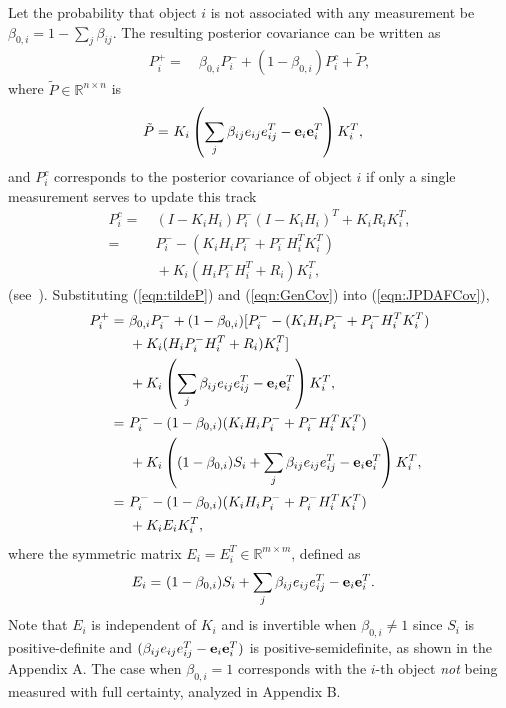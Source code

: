 \documentclass[letterpaper, 10pt, conference]{ieeeconf}
\newcommand{\parenth}[1]{\ensuremath{\left( #1 \right)}}
\newcommand{\refeqn}[1]{(\ref{eqn:#1})}
\renewcommand{\Re}{\ensuremath{\mathbb{R}}}
\begin{document}
Let the probability that object $i$ is not associated with any measurement be $\beta_{0,i}=1-{\sum\limits_{j} \beta_{ij}}$.
The resulting posterior covariance can be written as
\begin{align}
\label{eqn:JPDAFCov}
P^+_{i}=&\ \beta_{0,i}P^-_{i}+(1-\beta_{0,i})P_i^c+\tilde P,
\end{align}
where $\tilde P\in\Re^{n\times n}$ is
\begin{align}
\tilde P=&\ K_i\parenth{{\sum\limits_{j} \beta_{ij}e_{ij}e_{ij}^T-{\bf{e}}_{i}}{\bf{e}}_{i}^T}K_{i}^T,\label{eqn:tildeP}
\end{align}
and $P_i^c$ corresponds to the posterior covariance of object $i$ if only a single measurement serves to update this track~\cite{TrackDataAssoc}%
\begin{align}
P^c_i=&\ (I-K_iH_i)P^-_i(I-K_iH_i)^T+K_iR_iK_i^T,\nonumber
\\
=&\ P^-_i-(K_iH_iP^-_i+P^-_iH_i^TK_i^T)\nonumber
\\
&\ +K_i(H_iP^-_iH_i^T+R_i)K_i^T,
\label{eqn:GenCov}
\end{align}
(see~\cite{OptEst1}).
Substituting \refeqn{tildeP} and \refeqn{GenCov} into \refeqn{JPDAFCov},%
\begin{align}
P^+_{i}=&\ \beta_{0,i}P^-_{i}+(1-\beta_{0,i})[P^-_i-(K_iH_iP^-_i+P^-_iH_i^TK_i^T)\nonumber
\\
&\ +K_i(H_iP^-_iH_i^T+R_i)K_i^T]\nonumber
\\
&\ +K_i\left({\sum\limits_{j} \beta_{ij}e_{ij}e_{ij}^T-{\bf{e}}_{i}}{\bf{e}}_{i}^T\right)K_{i}^T,\nonumber
\\
=&\ P^-_{i}-(1-\beta_{0,i})(K_iH_iP^-_i+P^-_iH_i^TK_i^T)\nonumber
\\
&\ +K_i\left((1-\beta_{0,i})S_i+{\sum\limits_{j} \beta_{ij}e_{ij}e_{ij}^T-{\bf{e}}_{i}}{\bf{e}}_{i}^T\right)K_i^T,\nonumber
\\
=&\ P^-_{i}-(1-\beta_{0,i})(K_iH_iP^-_i+P^-_iH_i^TK_i^T)\nonumber
\\
&\ +K_iE_iK_i^T,\label{eqn:CovExpanded}
\end{align}
where the symmetric matrix $E_i=E_i^T\in\Re^{m\times m}$, defined as
\begin{align}
E_i=&\ (1-\beta_{0,i})S_i+{\sum\limits_{j} \beta_{ij}e_{ij}e_{ij}^T-{\bf{e}}_{i}}{\bf{e}}_{i}^T.\label{eqn:E}
\end{align}
Note that $E_i$ is independent of $K_i$ and is invertible when $\beta_{0,i}\neq1$ since $S_i$ is positive-definite and
$(\beta_{ij}e_{ij}e_{ij}^T-{\bf{e}}_{i}{\bf{e}}_{i}^T)$ is positive-semidefinite, as shown in the Appendix A. 
The case when $\beta_{0,i}=1$ corresponds with the $i$-th object \emph{not} being measured with full certainty, analyzed in Appendix B.
\end{document}
